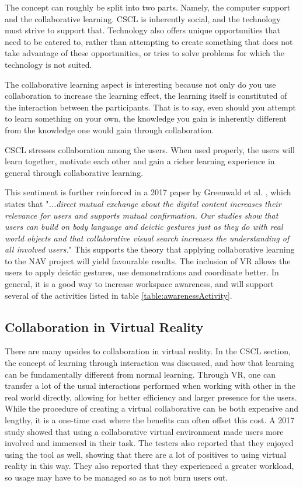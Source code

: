 The concept can roughly be split into two parts. Namely, the computer support and the collaborative learning. CSCL is inherently social, and the technology must strive to support that. Technology also offers unique opportunities that need to be catered to, rather than attempting to create something that does not take advantage of these opportunities, or tries to solve problems for which the technology is not suited.

The collaborative learning aspect is interesting because not only do you use collaboration to increase the learning effect, the learning itself is constituted of the interaction between the participants\cite{stahl2006computer}. That is to say, even should you attempt to learn something on your own, the knowledge you gain is inherently different from the knowledge one would gain through collaboration.


CSCL stresses collaboration among the users. When used properly, the users will learn together, motivate each other and gain a richer learning experience in general through collaborative learning.

This sentiment is further reinforced in a 2017 paper by Greenwald et al. \cite{greenwald2017technology}, which states that "\textit{...direct mutual exchange about the digital content increases their relevance for users and supports mutual confirmation. Our studies show that users can build on body language and deictic gestures just as they do with real world objects and that collaborative visual search increases the understanding of all involved users.}" This supports the theory that applying collaborative learning to the NAV project will yield favourable results. The inclusion of VR allows the users to apply deictic gestures, use demonstrations and coordinate better. In general, it is a good way to increase workspace awareness, and will support several of the activities listed in table \ref{table:awarenessActivity}.

\subsection{Collaboration in Virtual Reality}
There are many upsides to collaboration in virtual reality. In the CSCL section, the concept of learning through interaction was discussed, and how that learning can be fundamentally different from normal learning. Through VR, one can transfer a lot of the usual interactions performed when working with other in the real world directly, allowing for better efficiency and larger presence for the users\cite{greenwald2017technology}. While the procedure of creating a virtual collaborative can be both expensive and lengthy, it is a one-time cost where the benefits can often offset this cost.  A 2017 study showed that using a collaborative virtual environment made users more involved and immersed in their task. The testers also reported that they enjoyed using the tool as well, showing that there are a lot of positives to using virtual reality in this way. They also reported that they experienced a greater workload, so usage may have to be managed so as to not burn users out\cite{madathil2017investigation}.

